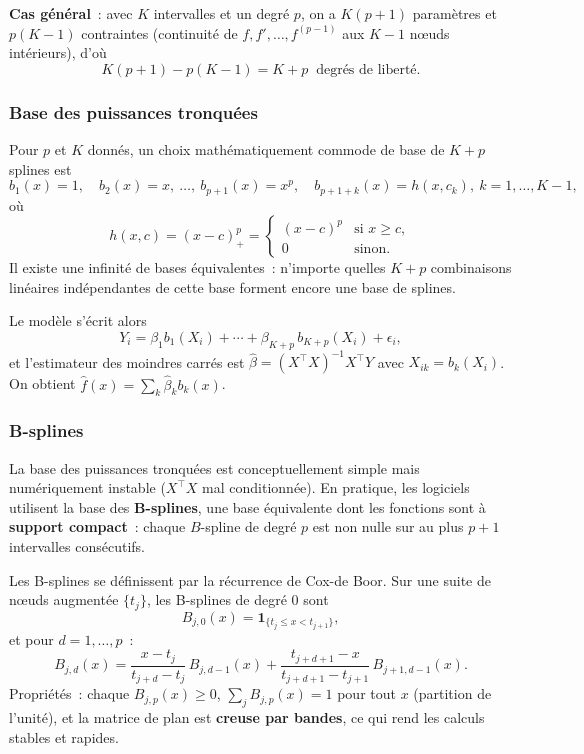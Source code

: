 \documentclass[11pt,letterpaper]{article}
\begin{document}
\textbf{Cas général}~: avec $K$ intervalles et un degré $p$, on a $K(p+1)$ paramètres et $p(K-1)$ contraintes (continuité de $f, f',\ldots,f^{(p-1)}$ aux $K-1$ n\oe uds intérieurs), d'où
$$K(p+1) - p(K-1) = K + p \ \mbox{ degrés de liberté}.$$

\subsubsection{Base des puissances tronquées}

Pour $p$ et $K$ donnés, un choix mathématiquement commode de base de $K+p$ splines est
$$b_1(x) = 1,\quad b_2(x) = x,\ \ldots,\ b_{p+1}(x) = x^p,\quad b_{p+1+k}(x) = h(x, c_k),\ k=1,\ldots,K-1,$$
où
$$h(x,c) = (x - c)_+^p = \begin{cases}(x-c)^p & \mbox{si } x\geq c,\\ 0 & \mbox{sinon}.\end{cases}$$
Il existe une infinité de bases équivalentes~: n'importe quelles $K+p$ combinaisons linéaires indépendantes de cette base forment encore une base de splines.

Le modèle s'écrit alors
$$Y_i = \beta_1 b_1(X_i) + \cdots + \beta_{K+p}\, b_{K+p}(X_i) + \epsilon_i,$$
et l'estimateur des moindres carrés est $\hat\beta = (X^\top X)^{-1}X^\top Y$ avec $X_{ik} = b_k(X_i)$. On obtient $\hat f(x) = \sum_k\hat\beta_k b_k(x)$.

\subsubsection{B-splines}
\label{subsec:bsplines}

La base des puissances tronquées est conceptuellement simple mais numériquement instable ($X^\top X$ mal conditionnée). En pratique, les logiciels utilisent la base des \textbf{B-splines}, une base équivalente dont les fonctions sont à \textbf{support compact}~: chaque $B$-spline de degré $p$ est non nulle sur au plus $p+1$ intervalles consécutifs.

Les B-splines se définissent par la récurrence de Cox-de Boor. Sur une suite de n\oe uds augmentée $\{t_j\}$, les B-splines de degré 0 sont
$$B_{j,0}(x) = \mathbf{1}_{\{t_j \leq x < t_{j+1}\}},$$
et pour $d = 1,\ldots,p$~:
$$B_{j,d}(x) = \frac{x - t_j}{t_{j+d} - t_j}\,B_{j,d-1}(x) + \frac{t_{j+d+1} - x}{t_{j+d+1} - t_{j+1}}\,B_{j+1,d-1}(x).$$
Propriétés~: chaque $B_{j,p}(x) \geq 0$, $\sum_j B_{j,p}(x) = 1$ pour tout $x$ (partition de l'unité), et la matrice de plan est \textbf{creuse par bandes}, ce qui rend les calculs stables et rapides.
\end{document}
